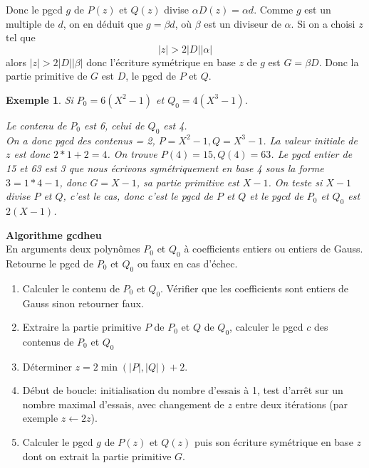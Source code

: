 \documentclass[a4paper,11pt]{book}
\newtheorem{example}[thm]{Exemple}
\begin{document}
\begin{giacjshere}
\begin{itemize}
  
  Donc le pgcd $g$ de $P ( z )$ et $Q ( z )$ divise $\alpha D ( z ) = \alpha
  d$. Comme $g$ est un multiple de $d$, on en déduit que $g = \beta d$, où
  $\beta$ est un diviseur de $\alpha$. Si on a choisi $z$ tel que
  \[ | z | > 2 | D | | \alpha | \]
  alors $| z | > 2 | D | | \beta |$ donc l'écriture symétrique en base $z$ de
  $g$ est $G = \beta D$. Donc la partie primitive de $G$ est $D$, le
  pgcd de $P$ et $Q$.
  
  
\end{itemize}
\begin{example}
  Si $P_0 = 6 ( X^2 - 1 )$ et $Q_0 = 4 ( X^3 - 1 )$.
  
  Le contenu de $P_0$ est 6, celui de $Q_0$ est 4.\\
  On a donc pgcd des contenus = 2, $P = X^2 - 1, Q = X^3 - 1$. La valeur
  initiale de $z$ est donc $2 \ast 1 + 2 = 4$. On trouve $P ( 4 ) = 15, Q ( 4
  ) = 63$. Le pgcd entier de 15 et 63 est 3 que nous écrivons symétriquement
  en base 4 sous la forme $3 = 1 \ast 4 - 1$, donc $G = X - 1$, sa partie
  primitive est $X - 1$. On teste si $X - 1$ divise $P$ et $Q$, c'est le cas,
  donc c'est le pgcd de $P$ et $Q$ et le pgcd de $P_0$ et $Q_0$ est $2 ( X - 1
  )$.
\end{example}

{\bf Algorithme gcdheu}\\
En arguments deux polynômes $P_0$ et $Q_0$ à coefficients entiers ou entiers
de Gauss. Retourne le pgcd de 
$P_0$ et $Q_0$ ou faux en cas d'échec.
\begin{enumerate}
  \item Calculer le contenu de $P_0$ et $Q_0$. Vérifier que les coefficients
  sont entiers de Gauss sinon retourner faux.
  
  \item Extraire la partie primitive $P$ de $P_0$ et $Q$ de $Q_0$, calculer le
  pgcd $c$ des contenus de $P_0$ et $Q_0$
  
  \item Déterminer $z = 2 \min ( | P |, | Q | ) + 2$.
  
  \item Début de boucle: initialisation du nombre d'essais à 1, test d'arrêt
  sur un nombre maximal d'essais, avec changement de $z$ entre deux itérations
  (par exemple $z \leftarrow 2 z$).
  
  \item Calculer le pgcd $g$ de $P ( z )$ et $Q ( z )$ puis son écriture
  symétrique en base $z$ dont on extrait la partie primitive $G$.
  

\end{enumerate}
\end{giacjshere}
\end{document}
